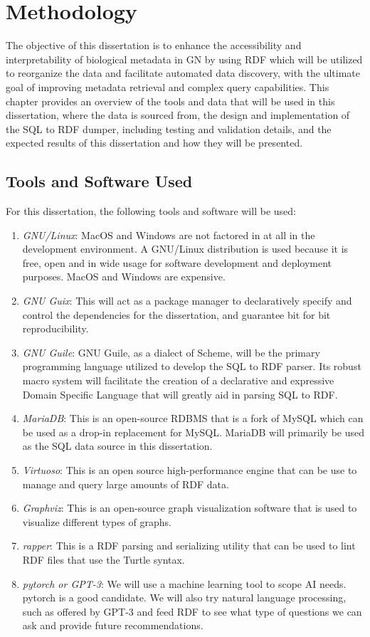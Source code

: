 \section{Methodology}

The objective of this dissertation is to enhance the accessibility and interpretability of biological metadata in GN by using RDF which will be utilized to reorganize the data and facilitate automated data discovery, with the ultimate goal of improving metadata retrieval and complex query capabilities.  This chapter provides an overview of the tools and data that will be used in this dissertation, where the data is sourced from, the design and implementation of the SQL to RDF dumper, including testing and validation details, and the expected results of this dissertation and how they will be presented.

\subsection{Tools and Software Used}

For this dissertation, the following tools and software will be used:

\begin{enumerate}
\item \textit{GNU/Linux}:  MacOS and Windows are not factored in at all in the development environment.  A GNU/Linux distribution is used because it is free, open and in wide usage for software development and deployment purposes.  MacOS and Windows are expensive.
\item \textit{GNU Guix}: This will act as a package manager to declaratively specify and control the dependencies for the dissertation, and guarantee bit for bit reproducibility.
\item \textit{GNU Guile}: GNU Guile, as a dialect of Scheme, will be the primary programming language utilized to develop the SQL to RDF parser. Its robust macro system will facilitate the creation of a declarative and expressive Domain Specific Language that will greatly aid in parsing SQL to RDF.
\item \textit{MariaDB}: This is an open-source RDBMS that is a fork of MySQL which can be used as a drop-in replacement for MySQL.  MariaDB will primarily be used as the SQL data source in this dissertation.
\item \textit{Virtuoso}: This is an open source high-performance engine that can be use to manage and query large amounts of RDF data.
\item \textit{Graphviz}: This is an open-source graph visualization software that is used to visualize different types of graphs.
\item \textit{rapper}: This is a RDF parsing and serializing utility that can be used to lint RDF files that use the Turtle syntax.
\item \textit{pytorch or GPT-3}: We will use a machine learning tool to scope AI needs. pytorch is a good candidate.  We will also try natural language processing, such as offered by GPT-3 and feed RDF to see what type of questions we can ask and provide future recommendations.
\end{enumerate}


